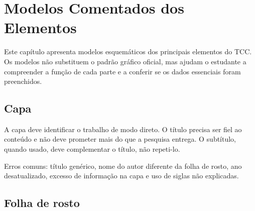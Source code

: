 \chapter{Modelos Comentados dos Elementos}

Este capítulo apresenta modelos esquemáticos dos principais elementos do TCC. Os modelos não substituem o padrão gráfico oficial, mas ajudam o estudante a compreender a função de cada parte e a conferir se os dados essenciais foram preenchidos.

\section{Capa}


A capa deve identificar o trabalho de modo direto. O título precisa ser fiel ao conteúdo e não deve prometer mais do que a pesquisa entrega. O subtítulo, quando usado, deve complementar o título, não repeti-lo.

Erros comuns: título genérico, nome do autor diferente da folha de rosto, ano desatualizado, excesso de informação na capa e uso de siglas não explicadas.

\section{Folha de rosto}


